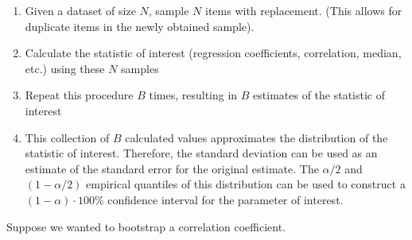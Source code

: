 \documentclass[
  letterpaper,
  DIV=11,
  numbers=noendperiod]{scrreport}
\newenvironment{Shaded}{\begin{snugshade}}{\end{snugshade}}
\newcommand{\AttributeTok}[1]{\textcolor[rgb]{0.40,0.45,0.13}{#1}}
\newcommand{\CommentTok}[1]{\textcolor[rgb]{0.37,0.37,0.37}{#1}}
\newcommand{\ControlFlowTok}[1]{\textcolor[rgb]{0.00,0.23,0.31}{#1}}
\newcommand{\DecValTok}[1]{\textcolor[rgb]{0.68,0.00,0.00}{#1}}
\newcommand{\FunctionTok}[1]{\textcolor[rgb]{0.28,0.35,0.67}{#1}}
\newcommand{\NormalTok}[1]{\textcolor[rgb]{0.00,0.23,0.31}{#1}}
\newcommand{\OtherTok}[1]{\textcolor[rgb]{0.00,0.23,0.31}{#1}}
\newcommand{\SpecialCharTok}[1]{\textcolor[rgb]{0.37,0.37,0.37}{#1}}
\newcommand{\StringTok}[1]{\textcolor[rgb]{0.13,0.47,0.30}{#1}}
\providecommand{\tightlist}{%
  \setlength{\itemsep}{0pt}\setlength{\parskip}{0pt}}\usepackage{longtable,booktabs,array}
\begin{document}
\begin{enumerate}
\def\labelenumi{\arabic{enumi}.}
\tightlist
\item
  Given a dataset of size \(N\), sample \(N\) items with replacement.
  (This allows for duplicate items in the newly obtained sample).
\item
  Calculate the statistic of interest (regression coefficients,
  correlation, median, etc.) using these \(N\) samples
\item
  Repeat this procedure \(B\) times, resulting in \(B\) estimates of the
  statistic of interest
\item
  This collection of \(B\) calculated values approximates the
  distribution of the statistic of interest. Therefore, the standard
  deviation can be used as an estimate of the standard error for the
  original estimate. The \(\alpha/2\) and \((1 - \alpha/2)\) empirical
  quantiles of this distribution can be used to construct a
  \((1-\alpha)\cdot 100\%\) confidence interval for the parameter of
  interest.
\end{enumerate}

Suppose we wanted to bootstrap a correlation coefficient.

\begin{Shaded}
\end{Shaded}
\end{document}
